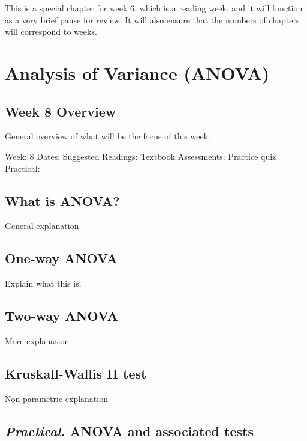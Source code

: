 \documentclass[
]{scrbook}
\begin{document}
This is a special chapter for week 6, which is a reading week, and it will function as a very brief pause for review. It will also ensure that the numbers of chapters will correspond to weeks.

\hypertarget{part-analysis-of-variance-anova}{%
\part{Analysis of Variance (ANOVA)}\label{part-analysis-of-variance-anova}}

\hypertarget{Week8}{%
\chapter*{Week 8 Overview}\label{Week8}}

General overview of what will be the focus of this week.

Week: 8
Dates:
Suggested Readings: Textbook
Assessments: Practice quiz
Practical:

\hypertarget{what-is-anova}{%
\chapter{What is ANOVA?}\label{what-is-anova}}

General explanation

\hypertarget{one-way-anova}{%
\chapter{One-way ANOVA}\label{one-way-anova}}

Explain what this is.

\hypertarget{two-way-anova}{%
\chapter{Two-way ANOVA}\label{two-way-anova}}

More explanation

\hypertarget{kruskall-wallis-h-test}{%
\chapter{Kruskall-Wallis H test}\label{kruskall-wallis-h-test}}

Non-parametric explanation

\hypertarget{practical.-anova-and-associated-tests}{%
\chapter{\texorpdfstring{\emph{Practical}. ANOVA and associated tests}{Practical. ANOVA and associated tests}}\label{practical.-anova-and-associated-tests}}
\end{document}
